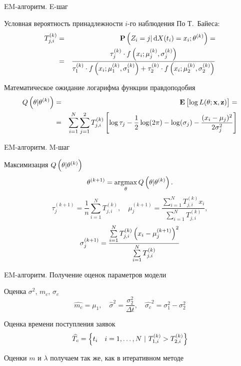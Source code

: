 \documentclass[utf8,handout]{beamer}
\DeclareMathOperator*{\argmax}{\arg\!\max}
\begin{document}
\begin{frame}{EM-алгоритм. E-шаг}
\begin{block}{Условная вероятность принадлежности $i$-го наблюдения}
По Т.~Байеса:
\begin{eqnarray*}
  T_{j,i}^{(k)} 
    &=& \mathbf{P}\del{Z_i = j \vert \dif X(t_i) = x_i; \theta^{(k)}} = \\
    &=& 
    \frac{\tau_j^{(k)} \cdot f\del{x_i; \mu_j^{(k)}, \sigma_j^{(k)}}}
         {\tau_1^{(k)} \cdot f\del{x_i; \mu_1^{(k)}, \sigma_1^{(k)}} + 
         {\tau_2^{(k)} \cdot f\del{x_i; \mu_2^{(k)}, \sigma_2^{(k)}}}}
\end{eqnarray*}
\end{block}
\begin{block}{Математическое ожидание логарифма функции правдоподобия}
\begin{eqnarray*}
  Q\del{\theta \vert \theta^{(k)}} 
    &=& 
    \mathbf{E}\sbr{\log L(\theta; \mathbf{x}, \mathbf{z})} = \\
    &=& \sum\limits_{i=1}^{N} \sum\limits_{j=1}^2
      T_{j,i}^{(k)} 
        \sbr{
          \log \tau_j - 
          \frac{1}{2}\log(2\pi) -
          \log(\sigma_j) -
          \frac{(x_i - \mu_j)^2}{2 \sigma_j^2}
        }
\end{eqnarray*}
\end{block}
\end{frame}


\begin{frame}{EM-алгоритм. M-шаг}
\begin{block}{Максимизация $Q\del{\theta \vert \theta^{(k)}}$}
$$
\theta^{(k+1)} = \argmax\limits_{\theta} Q\del{\theta \vert \theta^{(k)}}.
$$
$$
\tau_j^{(k+1)} = \frac{1}{n} \sum\limits_{i=1}^{N} T_{j,i}^{(k)},\quad
\mu_j^{(k+1)} = \frac
  {\sum\limits_{i=1}^{N} T_{j,i}^{(k)} x_i}
  {\sum\limits_{i=1}^{N} T_{j,i}^{(k)}},
$$
$$
\sigma_j^{(k+1)} = \frac
  {\sum\limits_{i=1}^{N} T_{j,i}^{(k)} \del{x_i - \mu_j^{(k+1)}}^2}
  {\sum\limits_{i=1}^{N} T_{j,i}^{(k)}}
$$
\end{block}
\end{frame}


\begin{frame}{EM-алгоритм. Получение оценок параметров модели}
\begin{block}{Оценка $\sigma^2$, $m_c$, $\sigma_c$}
$$
  \widehat{m_c} = \mu_1, \quad 
  \widehat{\sigma}^2 = \frac{\sigma_2^2}{\Delta t}, \quad
  \widehat{\sigma_c}^2 = \sigma_1^2 - \sigma_2^2
$$
\end{block}
\begin{block}{Оценка времени поступления заявок}
$$\widehat{T_c} = \cbr{t_i \quad i=1,\ldots,N\ \vert\ 
    T_{1,i}^{(k)} > T_{2,i}^{(k)}}$$
\end{block}

Оценки $m$ и $\lambda$ получаем так же, как в итеративном методе
\end{frame}
\end{document}
